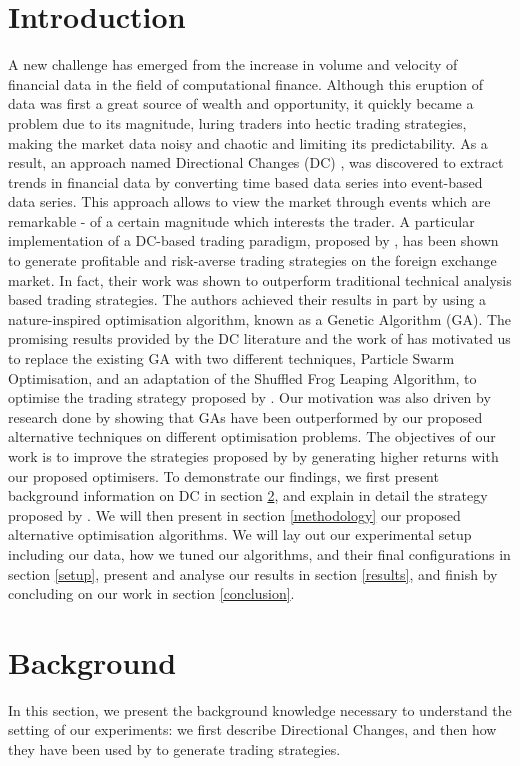 \documentclass[conference]{IEEEtran}
\begin{document}
\section{Introduction}
A new challenge has emerged from the increase in volume and velocity of financial data in the field of computational finance. Although this eruption of data was first a great source of wealth and opportunity, it quickly became a problem due to its magnitude, luring traders into hectic trading strategies, making the market data noisy and chaotic and limiting its predictability.
As a result, an approach named Directional Changes (DC) , was discovered to extract trends in financial data by converting time based data series into event-based data series. This approach allows to view the market through events which are remarkable - of a certain magnitude which interests the trader.
A particular implementation of a DC-based trading paradigm, proposed by \cite{kampouridis_otero_dc_ga}, has been shown to generate profitable and risk-averse trading strategies on the foreign exchange market. In fact, their work was shown to outperform traditional technical analysis based trading strategies. The authors achieved their results in part by using a nature-inspired optimisation algorithm, known as a Genetic Algorithm (GA).
The promising results provided by the DC literature and the work of \cite{kampouridis_otero_dc_ga} has motivated us to replace the existing GA with two different techniques, Particle Swarm Optimisation, and an adaptation of the Shuffled Frog Leaping Algorithm, to optimise the trading strategy proposed by \cite{kampouridis_otero_dc_ga}. Our motivation was also driven by research done by \cite{evo_algos_comparison} showing that GAs have been outperformed by our proposed alternative techniques on different optimisation problems. 
The objectives of our work is to improve the strategies proposed by \cite{kampouridis_otero_dc_ga}  by generating higher returns with our proposed optimisers. To demonstrate our findings, we first present background information on DC in section \ref{background}, and explain in detail the strategy proposed by \cite{kampouridis_otero_dc_ga}. We will then present in section \ref{methodology} our proposed alternative optimisation algorithms. We will lay out our experimental setup including our data, how we tuned our algorithms, and their final configurations in section \ref{setup}, present and analyse our results in section \ref{results}, and finish by concluding on our work in section \ref{conclusion}.

\section{Background}\label{background}
In this section, we present the background knowledge necessary to understand the setting of our experiments: we  first describe Directional Changes, and then how they have been used by \cite{kampouridis_otero_dc_ga} to generate trading strategies.
\end{document}
